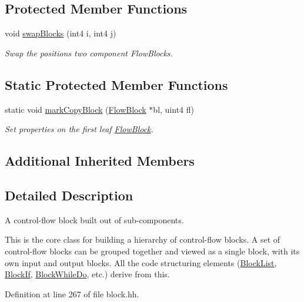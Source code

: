 \subsection*{Protected Member Functions}
\begin{DoxyCompactItemize}
\item 
void \mbox{\hyperlink{class_block_graph_ab7f8b2b90699d158b7b617012598f61c}{swap\+Blocks}} (int4 i, int4 j)
\begin{DoxyCompactList}\small\item\em Swap the positions two component Flow\+Blocks. \end{DoxyCompactList}\end{DoxyCompactItemize}
\subsection*{Static Protected Member Functions}
\begin{DoxyCompactItemize}
\item 
static void \mbox{\hyperlink{class_block_graph_ad522a7201e4327411cd161b04d57f1da}{mark\+Copy\+Block}} (\mbox{\hyperlink{class_flow_block}{Flow\+Block}} $\ast$bl, uint4 fl)
\begin{DoxyCompactList}\small\item\em Set properties on the first leaf \mbox{\hyperlink{class_flow_block}{Flow\+Block}}. \end{DoxyCompactList}\end{DoxyCompactItemize}
\subsection*{Additional Inherited Members}


\subsection{Detailed Description}
A control-\/flow block built out of sub-\/components. 

This is the core class for building a hierarchy of control-\/flow blocks. A set of control-\/flow blocks can be grouped together and viewed as a single block, with its own input and output blocks. All the code structuring elements (\mbox{\hyperlink{class_block_list}{Block\+List}}, \mbox{\hyperlink{class_block_if}{Block\+If}}, \mbox{\hyperlink{class_block_while_do}{Block\+While\+Do}}, etc.) derive from this. 

Definition at line 267 of file block.\+hh.



